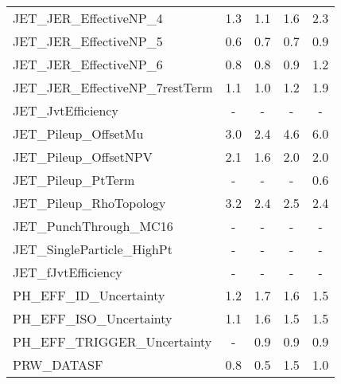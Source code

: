 \begin{table}[htbp]
{\begin{tabular}{l | cccc}
JET\_JER\_EffectiveNP\_4                     &   1.3 &   1.1 &   1.6 &   2.3 \\
JET\_JER\_EffectiveNP\_5                     &   0.6 &   0.7 &   0.7 &   0.9 \\
JET\_JER\_EffectiveNP\_6                     &   0.8 &   0.8 &   0.9 &   1.2 \\
JET\_JER\_EffectiveNP\_7restTerm             &   1.1 &   1.0 &   1.2 &   1.9 \\
JET\_JvtEfficiency                         &     - &     - &     - &     - \\
JET\_Pileup\_OffsetMu                       &   3.0 &   2.4 &   4.6 &   6.0 \\
JET\_Pileup\_OffsetNPV                      &   2.1 &   1.6 &   2.0 &   2.0 \\
JET\_Pileup\_PtTerm                         &     - &     - &     - &   0.6 \\
JET\_Pileup\_RhoTopology                    &   3.2 &   2.4 &   2.5 &   2.4 \\
JET\_PunchThrough\_MC16                     &     - &     - &     - &     - \\
JET\_SingleParticle\_HighPt                 &     - &     - &     - &     - \\
JET\_fJvtEfficiency                        &     - &     - &     - &     - \\
PH\_EFF\_ID\_Uncertainty                     &   1.2 &   1.7 &   1.6 &   1.5 \\
PH\_EFF\_ISO\_Uncertainty                    &   1.1 &   1.6 &   1.5 &   1.5 \\
PH\_EFF\_TRIGGER\_Uncertainty                &     - &   0.9 &   0.9 &   0.9 \\
PRW\_DATASF                                &   0.8 &   0.5 &   1.5 &   1.0 \\
\end{tabular}
}
\end{table}